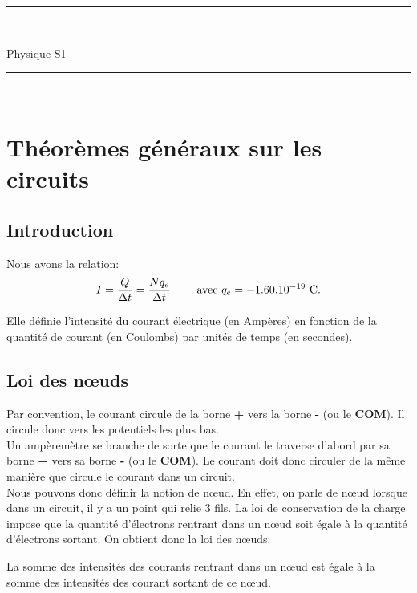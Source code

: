 \documentclass[12pt,a4paper,openany]{book}
\title{}
\author{Serrurot Gabin\\
BTS SNIR}
\date{\today}
\begin{document}
\sloppy

\begin{minipage}{0.9\linewidth}
\rule{\linewidth}{0.5mm}\\[0.2cm]
\huge\bfseries
\begin{center}
Physique S1
\end{center}
\rule{\linewidth}{0.5mm}\\[0.2cm]
\maketitle
\end{minipage}

\newpage

\tableofcontents

\newpage

\chapter{Théorèmes généraux sur les circuits}

\section{Introduction}

Nous avons la relation:
\begin{equation}
I = \frac{Q}{\Delta t} = \frac{Nq_{e}}{\Delta t} \text{\hspace{20px} avec $q_{e} = -1.60.10^{-19}$ C.}
\end{equation}

Elle définie l'intensité du courant électrique (en Ampères) en fonction de la quantité de courant (en Coulombs) par unités de temps (en secondes).

\section{Loi des nœuds}

Par convention, le courant circule de la borne \textbf{+} vers la borne \textbf{-} (ou le \textbf{COM}). Il circule donc vers les potentiels les plus bas.\\
Un ampèremètre se branche de sorte que le courant le traverse d'abord par sa borne \textbf{+} vers sa borne \textbf{-} (ou le \textbf{COM}). Le courant doit donc circuler de la même manière que circule le courant dans un circuit.\\
Nous pouvons donc définir la notion de nœud. En effet, on parle de nœud lorsque dans un circuit, il y a un point qui relie 3 fils. La loi de conservation de la charge impose que la quantité d'électrons rentrant dans un nœud soit égale à la quantité d'électrons sortant. On obtient donc la loi des nœuds:
\begin{Definition}
La somme des intensités des courants rentrant dans un nœud est égale à la somme des intensités des courant sortant de ce nœud.
\end{Definition} 
\end{document}
